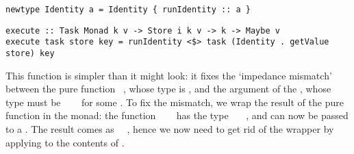 \vspace{1mm}
\begin{verbatim}
newtype Identity a = Identity { runIdentity :: a }
\end{verbatim}
\vspace{0mm}
\begin{verbatim}
execute :: Task Monad k v -> Store i k v -> k -> Maybe v
execute task store key = runIdentity <$> task (Identity . getValue store) key
\end{verbatim}
\vspace{1mm}

\noindent
This function is simpler than it might look: it fixes the `impedance mismatch'
between the pure function ~, whose type is \store, and
the  argument of the , whose type must be
~\hs{->}~~ for some . To fix the mismatch, we wrap the
result of the pure function in the  monad: the function
~~~ has the type
~\hs{->}~~, and can now be passed to a . The
result comes as ~~, hence we now need to get rid
of the  wrapper by applying  to the contents of
.

